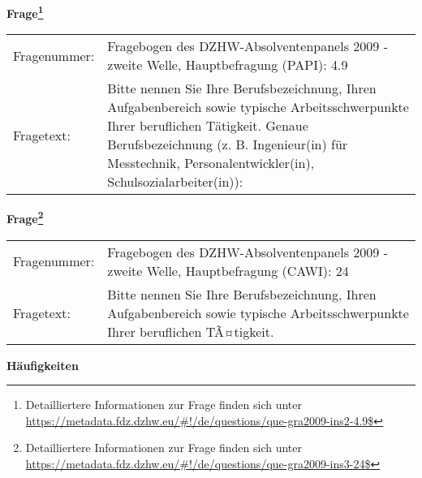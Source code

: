				\vspace*{0.5cm}
                \noindent\textbf{Frage\footnote{Detailliertere Informationen zur Frage finden sich unter
		              \url{https://metadata.fdz.dzhw.eu/\#!/de/questions/que-gra2009-ins2-4.9$}}}\\
				\begin{tabularx}{\hsize}{@{}lX}
					Fragenummer: &
					  Fragebogen des DZHW-Absolventenpanels 2009 - zweite Welle, Hauptbefragung (PAPI):
					  4.9
 \\
					Fragetext: & Bitte nennen Sie Ihre Berufsbezeichnung, Ihren Aufgabenbereich sowie typische Arbeitsschwerpunkte Ihrer beruflichen Tätigkeit. Genaue Berufsbezeichnung (z. B. Ingenieur(in) für Messtechnik, Personalentwickler(in), Schulsozialarbeiter(in)): \\
				\end{tabularx}
				\vspace*{0.5cm}
                \noindent\textbf{Frage\footnote{Detailliertere Informationen zur Frage finden sich unter
		              \url{https://metadata.fdz.dzhw.eu/\#!/de/questions/que-gra2009-ins3-24$}}}\\
				\begin{tabularx}{\hsize}{@{}lX}
					Fragenummer: &
					  Fragebogen des DZHW-Absolventenpanels 2009 - zweite Welle, Hauptbefragung (CAWI):
					  24
 \\
					Fragetext: & Bitte nennen Sie Ihre Berufsbezeichnung, Ihren Aufgabenbereich sowie typische Arbeitsschwerpunkte Ihrer beruflichen TÃ¤tigkeit. \\
				\end{tabularx}





        		\vspace*{0.5cm}
                \noindent\textbf{Häufigkeiten}

